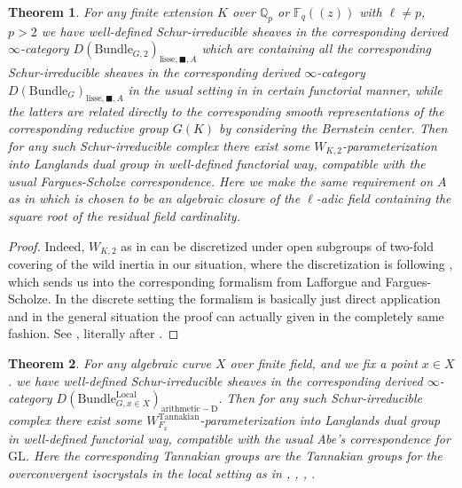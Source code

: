 \documentclass[12pt]{book}
\newtheorem{theorem}{Theorem}
\theoremstyle{definition}
\begin{document}
\begin{theorem}
For any finite extension $K$ over $\mathbb{Q}_p$ or $\mathbb{F}_q((z))$ with $\ell\neq p$, $p>2$ we have well-defined Schur-irreducible sheaves in the corresponding derived $\infty$-category $D(\mathrm{Bundle}_{G,2})_{\text{lisse},\blacksquare,A}$ which are containing all the corresponding Schur-irreducible sheaves in the corresponding derived $\infty$-category $D(\mathrm{Bundle}_{G})_{\text{lisse},\blacksquare,A}$ in the usual setting in \cite{FS} in certain functorial manner, while the latters are related directly to the corresponding smooth representations of the corresponding reductive group $G(K)$ by considering the Bernstein center. Then for any such Schur-irreducible complex there exist some $W_{K,2}$-parameterization into Langlands dual group in well-defined functorial way, compatible with the usual Fargues-Scholze correspondence. Here we make the same requirement on $A$ as in \cite{FS} which is chosen to be an algebraic closure of the $\ell$-adic field containing the square root of the residual field cardinality.
\end{theorem}

\begin{proof}
Indeed, $W_{K,2}$ as in \cite{FS} can be discretized under open subgroups of two-fold covering of the wild inertia in our situation, where the discretization is following \cite{FS}, which sends us into the corresponding formalism from Lafforgue and Fargues-Scholze. In the discrete setting the formalism is basically just direct application and in the general situation the proof can actually given in the completely same fashion. See \cite[Chapter VIII Theorem 4.1 and Chapter IX Proposition 4.1]{FS}, literally after \cite{VLa}.
\end{proof}

\begin{theorem}
For any algebraic curve $X$ over finite field, and we fix a point $x\in X$. we have well-defined Schur-irreducible sheaves in the corresponding derived $\infty$-category $D(\mathrm{Bundle}^\mathrm{Local}_{G,x\in X})_{\mathrm{arithmetic-D}}$. Then for any such Schur-irreducible complex there exist some $W^\mathrm{Tannakian}_{F_x}$-parameterization into Langlands dual group in well-defined functorial way, compatible with the usual Abe's correspondence for $\mathrm{GL}$. Here the corresponding Tannakian groups are the Tannakian groups for the overconvergent isocrystals in the local setting as in \cite{AI}, \cite{KI}, \cite{KXII}, \cite{DK}.
\end{theorem}
\end{document}
